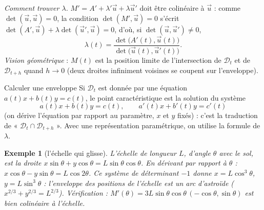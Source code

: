 \documentclass[a4paper,11pt]{article}
\numberwithin{equation}{section}
\numberwithin{figure}{section}
\numberwithin{table}{section}
\theoremstyle{enonce}
\theoremstyle{exemple}
\newtheorem{exemple}[definition]{Exemple}
\theoremstyle{remarque}
\newcommand{\ve}[1]{\vec{#1}}
\begin{document}
\emph{Comment trouver $\lambda$.} $M'=A'+\lambda'\ve u+\lambda\ve u'$ doit être colinéaire à $\ve u$ : comme $\det(\ve u,\ve u)=0$,
la condition $\det(M',\ve u)=0$ s'écrit $\det(A',\ve u)+\lambda\det(\ve u',\ve u)=0$, d'où, si $\det(\ve u,\ve u')\neq0$,
\[\lambda(t)=\frac{\det\big(A'(t),\ve u(t)\big)}{\det\big(\ve u(t),\ve u'(t)\big)}.\]
\emph{Vision géométrique} : $M(t)$ est la position limite de l'intersection de $\mathcal D_t$ et de $\mathcal D_{t+h}$ quand
$h\to0$ (deux droites infiniment voisines se coupent sur l'enveloppe).

\begin{methode}{Calculer une enveloppe}\label{meth:enveloppe}
Si $\mathcal D_t$ est donnée par une équation $a(t)x+b(t)y=c(t)$, le point caractéristique est la solution du système
\[a(t)x+b(t)y=c(t),\qquad a'(t)x+b'(t)y=c'(t)\]
(on dérive l'équation par rapport au paramètre, $x$ et $y$ fixés) : c'est la traduction de « $\mathcal D_t\cap\mathcal D_{t+h}$ ».
Avec une représentation paramétrique, on utilise la formule de $\lambda$.
\end{methode}

\noindent\begin{minipage}[c]{0.64\linewidth}
\begin{exemple}[l'échelle qui glisse]
L'échelle de longueur $L$, d'angle $\theta$ avec le sol, est la droite $x\sin\theta+y\cos\theta=L\sin\theta\cos\theta$. En
dérivant par rapport à $\theta$ : $x\cos\theta-y\sin\theta=L\cos2\theta$. Ce système de déterminant $-1$ donne
$x=L\cos^3\theta$, $y=L\sin^3\theta$ : l'enveloppe des positions de l'échelle est un arc d'\emph{astroïde}
($x^{2/3}+y^{2/3}=L^{2/3}$). Vérification : $M'(\theta)=3L\sin\theta\cos\theta\,(-\cos\theta,\sin\theta)$ est bien colinéaire à
l'échelle.
\end{exemple}
\end{minipage}\hfill
\begin{minipage}[c]{0.33\linewidth}\centering
{}
\label{fig:enveloppe}
\end{minipage}
\end{document}
